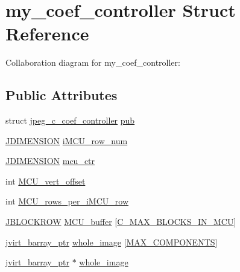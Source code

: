 \hypertarget{structmy__coef__controller}{}\section{my\+\_\+coef\+\_\+controller Struct Reference}
\label{structmy__coef__controller}


Collaboration diagram for my\+\_\+coef\+\_\+controller\+:
\subsection*{Public Attributes}
\begin{DoxyCompactItemize}
\item 
struct \mbox{\hyperlink{structjpeg__c__coef__controller}{jpeg\+\_\+c\+\_\+coef\+\_\+controller}} \mbox{\hyperlink{structmy__coef__controller_a5585d883f38ce6d73d0d2fb31457f4e5}{pub}}
\item 
\mbox{\hyperlink{jmorecfg_8h_a04ed4674f6f1d0d50ec241531e38274f}{J\+D\+I\+M\+E\+N\+S\+I\+ON}} \mbox{\hyperlink{structmy__coef__controller_aebf2f540f71a3af44f75544ef474badb}{i\+M\+C\+U\+\_\+row\+\_\+num}}
\item 
\mbox{\hyperlink{jmorecfg_8h_a04ed4674f6f1d0d50ec241531e38274f}{J\+D\+I\+M\+E\+N\+S\+I\+ON}} \mbox{\hyperlink{structmy__coef__controller_adfe2cbcbfc3c4760874392d8488d88fd}{mcu\+\_\+ctr}}
\item 
int \mbox{\hyperlink{structmy__coef__controller_a47e8d96f30f813289b02267601c4a7b4}{M\+C\+U\+\_\+vert\+\_\+offset}}
\item 
int \mbox{\hyperlink{structmy__coef__controller_a11bc55a8487bfdd201d2ca756d132023}{M\+C\+U\+\_\+rows\+\_\+per\+\_\+i\+M\+C\+U\+\_\+row}}
\item 
\mbox{\hyperlink{jpeglib_8h_a04dea0959d9bd9e8ddad83597161453b}{J\+B\+L\+O\+C\+K\+R\+OW}} \mbox{\hyperlink{structmy__coef__controller_a9eac536791caff80d2c99c204237b0ee}{M\+C\+U\+\_\+buffer}} \mbox{[}\mbox{\hyperlink{jpeglib_8h_a4f270f4efb3fc0bb09f0d5ffa51ca327}{C\+\_\+\+M\+A\+X\+\_\+\+B\+L\+O\+C\+K\+S\+\_\+\+I\+N\+\_\+\+M\+CU}}\mbox{]}
\item 
\mbox{\hyperlink{jpeglib_8h_a994f4cba141d82ded90af38e51223f0b}{jvirt\+\_\+barray\+\_\+ptr}} \mbox{\hyperlink{structmy__coef__controller_aedc0b0cdda57a7f9e8c49770995b12b4}{whole\+\_\+image}} \mbox{[}\mbox{\hyperlink{jmorecfg_8h_a6d8c910a1fdb6d4762a05f7250e64322}{M\+A\+X\+\_\+\+C\+O\+M\+P\+O\+N\+E\+N\+TS}}\mbox{]}
\item 
\mbox{\hyperlink{jpeglib_8h_a994f4cba141d82ded90af38e51223f0b}{jvirt\+\_\+barray\+\_\+ptr}} $\ast$ \mbox{\hyperlink{structmy__coef__controller_a7e6db8186140ced6ed561b2860c84819}{whole\+\_\+image}}

\end{DoxyCompactItemize}
